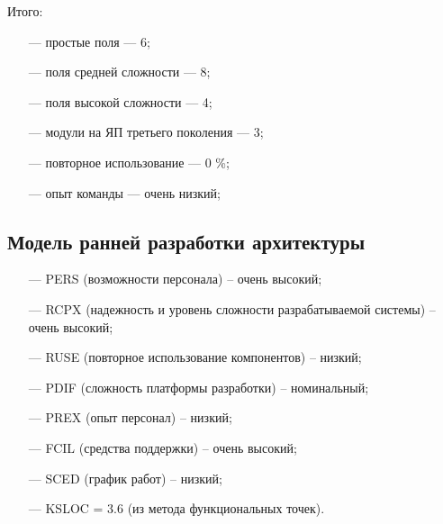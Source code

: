 Итого:

\begin{itemize}
    \item[---] простые поля --- 6;
    \item[---] поля средней сложности --- 8;
    \item[---] поля высокой сложности --- 4;
    \item[---] модули на ЯП третьего поколения --- 3;
    \item[---] повторное использование --- 0 \%;
    \item[---] опыт команды --- очень низкий;
\end{itemize}

\subsection{Модель ранней разработки архитектуры}

\begin{itemize}
\item[---] PERS (возможности персонала) – очень высокий;
\item[---] RCPX (надежность и уровень сложности разрабатываемой системы)
– очень высокий;
\item[---] RUSE (повторное использование компонентов) – низкий;
\item[---] PDIF (сложность платформы разработки) – номинальный;
\item[---] PREX (опыт персонал) – низкий;
\item[---] FCIL (средства поддержки) – очень высокий;
\item[---] SCED (график работ) – низкий;
\item[---] KSLOC = 3.6 (из метода функциональных точек).
\end{itemize}
